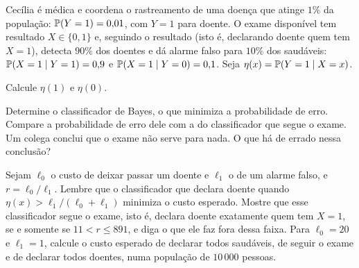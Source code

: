 Cecília é médica e coordena o rastreamento de uma doença que atinge $1\%$ da população:
$\mathbb{P}(Y=1)=0{,}01$, com $Y=1$ para doente. O exame disponível tem resultado $X\in\{0,1\}$ e,
seguindo o resultado (isto é, declarando doente quem tem $X=1$), detecta $90\%$ dos doentes
e dá alarme falso para $10\%$ dos saudáveis:
$\mathbb{P}(X=1\mid Y=1)=0{,}9$ e $\mathbb{P}(X=1\mid Y=0)=0{,}1$. Seja
$\eta(x)=\mathbb{P}(Y=1\mid X=x)$.
\begin{itens}
  \item {} Calcule $\eta(1)$ e $\eta(0)$.
  \item {} Determine o classificador de Bayes, o que minimiza a probabilidade de erro.
        Compare a probabilidade de erro dele com a do classificador que segue o exame. Um
        colega conclui que o exame não serve para nada. O que há de errado nessa conclusão?
  \item {} Sejam $\ell_0$ o custo de deixar passar um doente e $\ell_1$ o de um alarme
        falso, e $r=\ell_0/\ell_1$. Lembre que o classificador que declara doente quando
        $\eta(x)>\ell_1/(\ell_0+\ell_1)$ minimiza o custo esperado. Mostre que esse
        classificador segue o exame, isto é, declara doente exatamente quem tem $X=1$, se e
        somente se $11<r\le891$, e diga o que ele faz fora dessa faixa. Para $\ell_0=20$ e
        $\ell_1=1$, calcule o custo esperado de declarar todos saudáveis, de seguir o exame e
        de declarar todos doentes, numa população de $10\,000$ pessoas.
\end{itens}

